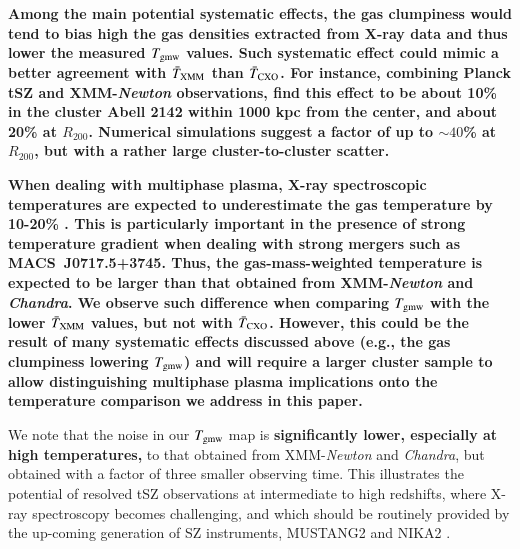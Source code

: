 \documentclass[twocolumn,traditabstract]{aa}
\begin{document}
{\bf Among the main potential systematic effects, the gas clumpiness would tend to bias high the gas densities extracted from X-ray data and thus lower the measured $T_{\rm gmw}$ values. Such systematic effect could mimic a better agreement with $\bar{T}_{\rm XMM}$ than $\bar{T}_{\rm CXO}$. For instance, combining Planck tSZ \citep{Planck2015I} and XMM-\textit{Newton} observations, \citep{Tchernin2016} find this effect to be about 10\% in the cluster Abell 2142 within 1000 kpc from the center, and about 20\% at $R_{200}$. Numerical simulations \citep[e.g.,][]{Nagai2011,Zhuravleva2013,Vazza2013} suggest a factor of up to $\sim 40$\% at $R_{200}$, but with a rather large cluster-to-cluster scatter.}

{\bf When dealing with multiphase plasma, X-ray spectroscopic temperatures are expected to underestimate the gas temperature by 10-20\% \citep{Mathiesen2001,maz04}. This is particularly important in the presence of strong temperature gradient when dealing with strong mergers such as \mbox{MACS~J0717.5+3745}. Thus, the gas-mass-weighted temperature is expected to be larger than that obtained from XMM-\textit{Newton} and \textit{Chandra}. We observe such difference when comparing $T_{\rm gmw}$ with the lower $\bar{T}_{\rm XMM}$ values, but not with $\bar{T}_{\rm CXO}$. However, this could be the result of many systematic effects discussed above (e.g., the gas clumpiness lowering $T_{\rm gmw}$) and will require a larger cluster sample to allow distinguishing multiphase plasma implications onto the temperature comparison we address in this paper.}

We note that the noise in our $T_{\rm gmw}$ map is {\bf significantly lower, especially at high temperatures,} to that obtained from XMM-\textit{Newton} and \textit{Chandra}, but obtained with a factor of three smaller observing time. This illustrates the potential of resolved tSZ observations at intermediate to high redshifts, where X-ray spectroscopy becomes challenging, and which should be routinely provided by the up-coming generation of SZ instruments, MUSTANG2 \citep{Dicker2014} and NIKA2 \citep{Calvo2016,Comis2016}.
\end{document}
